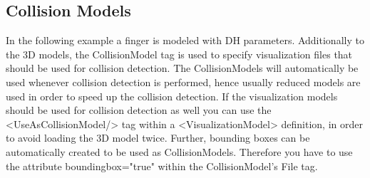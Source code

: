 \documentclass{book}
\begin{document}
\subsection{Collision Models}
\par
In the following example a finger is modeled with DH parameters. Additionally to the 3D models, the CollisionModel tag is used to specify visualization files that should be used for collision detection. The CollisionModels will automatically be used whenever collision detection is performed, hence usually reduced models are used in order to speed up the collision detection. If the visualization models should be used for collision detection as well you can use the <UseAsCollisionModel/> tag within a <VisualizationModel> definition, in order to avoid loading the 3D model twice. Further, bounding boxes can be automatically created to be used as CollisionModels. Therefore you have to use the attribute boundingbox="true" within the CollisionModel's File tag. 
\par
\end{document}
